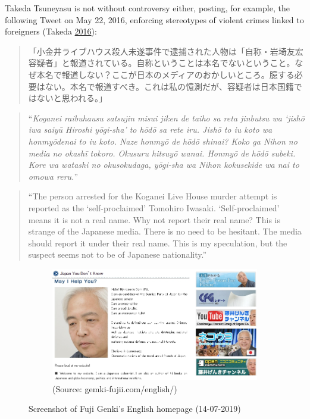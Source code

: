 \documentclass[10pt,british,A4paper,twoside]{memoir}
\begin{document}
Takeda Tsuneyasu is not without controversy either, posting, for
example, the following Tweet on May 22, 2016, enforcing stereotypes of
violent crimes linked to foreigners (Takeda
\protect\hyperlink{ref-takeda_eng._2016}{2016}):

\begin{quote}
「小金井ライブハウス殺人未遂事件で逮捕された人物は「自称・岩埼友宏容疑者」と報道されている。自称ということは本名でないということ。なぜ本名で報道しない？ここが日本のメディアのおかしいところ。臆する必要はない。本名で報道すべき。これは私の憶測だが、容疑者は日本国籍ではないと思われる。」
\end{quote}

\begin{quote}
``\emph{Koganei raibuhausu satsujin misui jiken de taiho sa reta
jinbutsu wa `jishō iwa saiyū Hiroshi yōgi-sha' to hōdō sa rete iru.
Jishō to iu koto wa honmyōdenai to iu koto. Naze honmyō de hōdō shinai?
Koko ga Nihon no media no okashī tokoro. Okusuru hitsuyō wanai. Honmyō
de hōdō subeki. Kore wa watashi no okusokudaga, yōgi-sha wa Nihon
kokusekide wa nai to omowa reru.}''
\end{quote}

\begin{quote}
``The person arrested for the Koganei Live House murder attempt is
reported as the `self-proclaimed' Tomohiro Iwasaki. `Self-proclaimed'
means it is not a real name. Why not report their real name? This is
strange of the Japanese media. There is no need to be hesitant. The
media should report it under their real name. This is my speculation,
but the suspect seems not to be of Japanese nationality.''
\end{quote}

\begin{figure}[!htb]
 \centering
 \begin{subfigure}[b]{1\textwidth}
 \includegraphics[width=\textwidth]{images/genkifuji.jpg}
 \caption*{(Source: gemki-fujii.com/english/)}
 \end{subfigure}
 \caption{Screenshot of Fuji Genki’s English homepage (14-07-2019)}\label{fig:genkifuji}
\end{figure}
\end{document}

